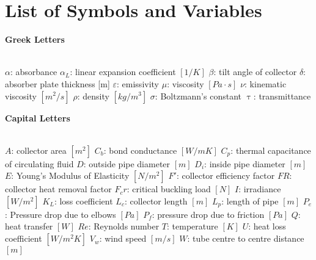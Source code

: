 \documentclass{ucalgarythesis}
\begin{document}
\listoffigures
\newpage

  
\listoftables
\newpage

  
\chapter{List of Symbols and Variables}      
\vspace{-2mm}

\textbf{Greek Letters}
\vspace{-7mm}
\begin{tabbing}
    \textbf{}\=\\
    \addsymbol \mbox{$\alpha$}: {absorbance}
    \addsymbol \mbox{$\alpha_L$}: {linear expansion coefficient $[1/K]$}
    \addsymbol \mbox{$\beta$}: {tilt angle of collector}
    \addsymbol \mbox{$\delta$}: {absorber plate thickness [m]}
    \addsymbol \mbox{$\varepsilon$}: {emissivity}
    \addsymbol \mbox{$\mu$}: {viscosity $[Pa\cdot s]$}
    \addsymbol \mbox{$\nu$}: {kinematic viscosity $[m^2/s]$}
    \addsymbol \mbox{$\rho$}: {density $[kg/m^3]$}
    \addsymbol \mbox{$\sigma$}: {Boltzmann's constant}
    \addsymbol \mbox{$\uptau$}: {transmittance} 
\end{tabbing}
\vspace{-3mm}

\textbf{Capital Letters}
\vspace{-7mm}
\begin{tabbing}
    \textbf{ }\=\\
    \addsymbol \mbox{$A$}: {collector area $[m^2]$}
    \addsymbol \mbox{$C_b$}: {bond conductance $[W/mK]$}
    \addsymbol \mbox{$C_p$}: {thermal capacitance of circulating fluid}
    \addsymbol \mbox{$D$}: {outside pipe diameter $[m]$}
    \addsymbol \mbox{$D_i$}: {inside pipe diameter $[m]$}
    \addsymbol \mbox{$E$}: {Young's Modulus of Elasticity $[N/m^2]$}
    \addsymbol \mbox{$F'$}: {collector efficiency factor}
    \addsymbol \mbox{$FR$}: {collector heat removal factor}
    \addsymbol \mbox{$F_cr$}: {critical buckling load $[N]$}
    \addsymbol \mbox{$I$}: {irradiance $[W/m^2]$}
    \addsymbol \mbox{$K_L$}: {loss coefficient}
    \addsymbol \mbox{$L_c$}: {collector length $[m]$}
    \addsymbol \mbox{$L_p$}: {length of pipe $[m]$}
    \addsymbol \mbox{$P_e$}: {Pressure drop due to elbows $[Pa]$}
    \addsymbol \mbox{$P_f$}: {pressure drop due to friction $[Pa]$}
    \addsymbol \mbox{$Q$}: {heat transfer $[W]$}
    \addsymbol \mbox{$Re$}: {Reynolds number}
    \addsymbol \mbox{$T$}: {temperature $[K]$}
    \addsymbol \mbox{$U$}: {heat loss coefficient $[W/m^2K]$}
    \addsymbol \mbox{$V_w$}: {wind speed $[m/s]$}
    \addsymbol \mbox{$W$}: {tube centre to centre distance $[m]$}
\end{tabbing}
\vspace{-3mm}
\end{document}
